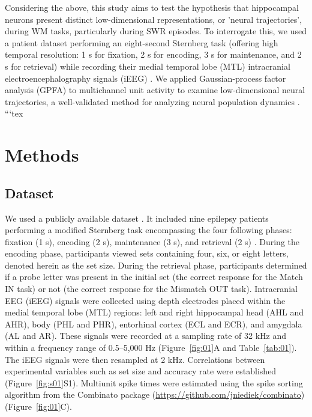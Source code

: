 \documentclass[final,3p,times,twocolumn]{elsarticle}
\begin{document}
\indent
Considering the above, this study aims to test the hypothesis that hippocampal neurons present distinct low-dimensional representations, or 'neural trajectories', during WM tasks, particularly during SWR episodes. To interrogate this, we used a patient dataset performing an eight-second Sternberg task (offering high temporal resolution: 1 s for fixation, 2 s for encoding, 3 s for maintenance, and 2 s for retrieval) while recording their medial temporal lobe (MTL) intracranial electroencephalography signals (iEEG) \cite{boran_dataset_2020}. We applied Gaussian-process factor analysis (GPFA) to multichannel unit activity to examine low-dimensional neural trajectories, a well-validated method for analyzing neural population dynamics \cite{yu_gaussian-process_2009}.
\label{sec:introduction}
```tex
\section{Methods}
\subsection{Dataset}
We used a publicly available dataset \cite{boran_dataset_2020}. It included nine epilepsy patients performing a modified Sternberg task encompassing the four following phases: fixation (1 s), encoding (2 s), maintenance (3 s), and retrieval (2 s) \cite{boran_dataset_2020}. During the encoding phase, participants viewed sets containing four, six, or eight letters, denoted herein as the set size. During the retrieval phase, participants determined if a probe letter was present in the initial set (the correct response for the Match IN task) or not (the correct response for the Mismatch OUT task). Intracranial EEG (iEEG) signals were collected using depth electrodes placed within the medial temporal lobe (MTL) regions: left and right hippocampal head (AHL and AHR), body (PHL and PHR), entorhinal cortex (ECL and ECR), and amygdala (AL and AR). These signals were recorded at a sampling rate of 32 kHz and within a frequency range of 0.5--5,000 Hz (Figure~\ref{fig:01}A and Table~\ref{tab:01}). The iEEG signals were then resampled at 2 kHz. Correlations between experimental variables such as set size and accuracy rate were established (Figure~\ref{fig:s01}S1). Multiunit spike times were estimated using the spike sorting algorithm from the Combinato package \cite{niediek_reliable_2016} (\url{https://github.com/jniediek/combinato})(Figure~\ref{fig:01}C).
\end{document}
